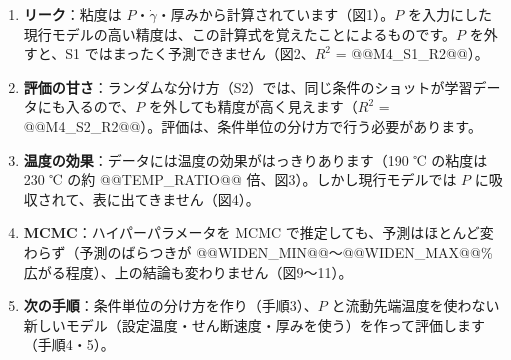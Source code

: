 \documentclass[paper=a4paper,fontsize=10.5pt,line_length=44zw,number_of_lines=38]{jlreq}
\newcommand{\gd}{\dot{\gamma}}
\begin{document}
\begin{enumerate}[itemsep=0.6ex,topsep=0.6ex]
\item \textbf{リーク}：粘度は $P$・$\gd$・厚みから計算されています（図1）。$P$ を入力にした現行モデルの高い精度は、この計算式を覚えたことによるものです。$P$ を外すと、S1 ではまったく予測できません（図2、$R^2$ = @@M4_S1_R2@@）。
\item \textbf{評価の甘さ}：ランダムな分け方（S2）では、同じ条件のショットが学習データにも入るので、$P$ を外しても精度が高く見えます（$R^2$ = @@M4_S2_R2@@）。評価は、条件単位の分け方で行う必要があります。
\item \textbf{温度の効果}：データには温度の効果がはっきりあります（190 ℃ の粘度は 230 ℃ の約 @@TEMP_RATIO@@ 倍、図3）。しかし現行モデルでは $P$ に吸収されて、表に出てきません（図4）。
\item \textbf{MCMC}：ハイパーパラメータを MCMC で推定しても、予測はほとんど変わらず（予測のばらつきが @@WIDEN_MIN@@〜@@WIDEN_MAX@@\% 広がる程度）、上の結論も変わりません（図9〜11）。
\item \textbf{次の手順}：条件単位の分け方を作り（手順3）、$P$ と流動先端温度を使わない新しいモデル（設定温度・せん断速度・厚みを使う）を作って評価します（手順4・5）。
\end{enumerate}
\end{document}
